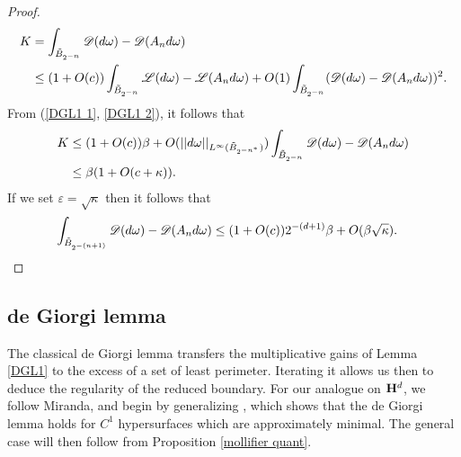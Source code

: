 \begin{proof}
\begin{align*}
K &= \int_{\tilde B_{2^{-n}}} \mathscr D(d\omega) - \mathscr D(A_n d\omega) \\
&\leq (1 + O(c)) \int_{\tilde B_{2^{-n}}} \mathscr L(d\omega) - \mathscr L(A_n d\omega) + O(1) \int_{\tilde B_{2^{-n}}} (\mathscr D(d\omega) - \mathscr D(A_n d\omega))^2.
\end{align*}
From (\ref{DGL1 1}, \ref{DGL1 2}), it follows that
\begin{align*}
K &\leq (1 + O(c))\beta + O(||d\omega||_{L^\infty(\tilde B_{2^{-n^*}})}) \int_{\tilde B_{2^{-n}}} \mathscr D(d\omega) - \mathscr D(A_n d\omega)\\
&\leq \beta(1 + O(c + \kappa)).
\end{align*}
If we set $\varepsilon = \sqrt \kappa$ then it follows that
\begin{align*}
\int_{\tilde B_{2^{-(n+1)}}} \mathscr D(d\omega) - \mathscr D(A_n d\omega) &\leq (1 + O(c)) 2^{-(d + 1)} \beta + O(\beta \sqrt \kappa). \qedhere
\end{align*}
\end{proof}


\subsection{de Giorgi lemma}
The classical de Giorgi lemma \cite{deGiorgi61} transfers the multiplicative gains of Lemma \ref{DGL1} to the excess of a set of least perimeter.
Iterating it allows us then to deduce the regularity of the reduced boundary.
For our analogue on $\mathbf H^d$, we follow Miranda, and begin by generalizing \cite[Teorema 4.4]{Miranda66}, which shows that the de Giorgi lemma holds for $C^1$ hypersurfaces which are approximately minimal.
The general case will then follow from Proposition \ref{mollifier quant}. 

